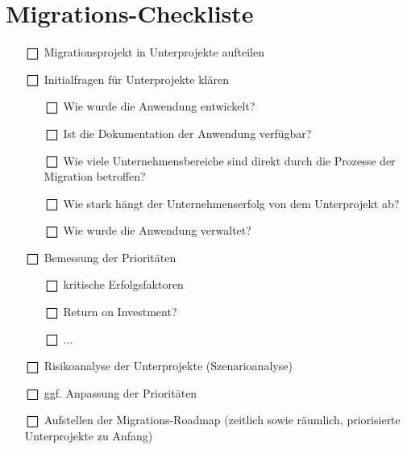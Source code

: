 \chapter{Migrations-Checkliste}
	\label{app:checkliste}
	
\begin{itemize}
	\item[$\msquare$] Migrationsprojekt in Unterprojekte aufteilen
	\item[$\msquare$] Initialfragen für Unterprojekte klären
	\begin{itemize}
		\item[$\msquare$] Wie wurde die Anwendung entwickelt?
		\item[$\msquare$] Ist die Dokumentation der Anwendung verfügbar?
		\item[$\msquare$] Wie viele Unternehmensbereiche sind direkt durch die Prozesse der Migration betroffen?
		\item[$\msquare$] Wie stark hängt der Unternehmenserfolg von dem Unterprojekt ab?
		\item[$\msquare$] Wie wurde die Anwendung verwaltet?
	\end{itemize}
	\item[$\msquare$] Bemessung der Prioritäten
	\begin{itemize}
		\item[$\msquare$] kritische Erfolgsfaktoren
		\item[$\msquare$] Return on Investment?
		\item[$\msquare$] ...
	\end{itemize}
	\item[$\msquare$] Risikoanalyse der Unterprojekte (Szenarioanalyse)
	\item[$\msquare$] ggf. Anpassung der Prioritäten
	\item[$\msquare$] Aufstellen der Migrations-Roadmap (zeitlich sowie räumlich, priorisierte Unterprojekte zu Anfang)
\end{itemize}